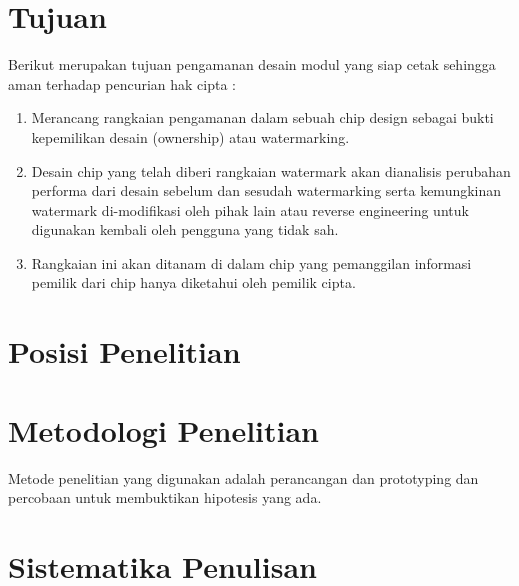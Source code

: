 \section{Tujuan}
Berikut merupakan tujuan pengamanan desain modul yang siap cetak
sehingga aman terhadap pencurian hak cipta :
\begin{enumerate}
	\item Merancang rangkaian pengamanan dalam sebuah chip design sebagai
	bukti kepemilikan desain (ownership) atau watermarking.
	
	\item Desain chip yang telah diberi rangkaian watermark akan dianalisis
	perubahan performa dari desain sebelum dan sesudah watermarking
	serta kemungkinan watermark di-modifikasi oleh pihak lain atau
	reverse engineering untuk digunakan kembali oleh pengguna yang tidak
	sah.
	
	\item Rangkaian ini akan ditanam di dalam chip yang pemanggilan informasi
	pemilik dari chip hanya diketahui oleh pemilik cipta.
\end{enumerate}

\section{Posisi Penelitian}


\section{Metodologi Penelitian}
Metode penelitian yang digunakan adalah perancangan dan prototyping dan percobaan untuk membuktikan hipotesis yang ada.

\section{Sistematika Penulisan}

